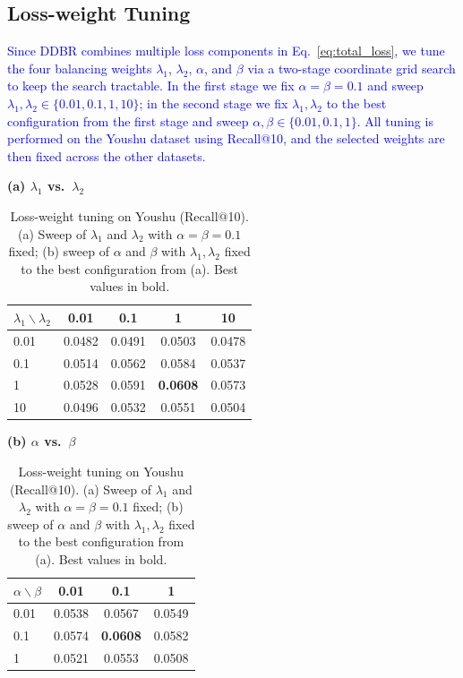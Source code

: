 \documentclass[lettersize,journal]{IEEEtran}
\newcommand{\revise}[1]{\textcolor{blue}{#1}}
\begin{document}
\subsection{Loss-weight Tuning}
\label{sec:loss_weight}
\revise{Since DDBR combines multiple loss components in Eq.~\eqref{eq:total_loss}, we tune the four balancing weights $\lambda_1$, $\lambda_2$, $\alpha$, and $\beta$ via a two-stage coordinate grid search to keep the search tractable. In the first stage we fix $\alpha=\beta=0.1$ and sweep $\lambda_1,\lambda_2\in\{0.01,0.1,1,10\}$; in the second stage we fix $\lambda_1,\lambda_2$ to the best configuration from the first stage and sweep $\alpha,\beta\in\{0.01,0.1,1\}$. All tuning is performed on the Youshu dataset using Recall@10, and the selected weights are then fixed across the other datasets.}

\begin{table}[htbp]
\caption{Loss-weight tuning on Youshu (Recall@10). (a) Sweep of $\lambda_1$ and $\lambda_2$ with $\alpha=\beta=0.1$ fixed; (b) sweep of $\alpha$ and $\beta$ with $\lambda_1,\lambda_2$ fixed to the best configuration from (a). Best values in bold.}
\label{tab:loss_weight}
\centering
\begin{minipage}{0.47\linewidth}\centering
\textbf{(a) $\lambda_1$ vs.\ $\lambda_2$} \\[0.2em]
\begin{tabular}{lcccc}
\toprule
$\lambda_1 \backslash \lambda_2$ & 0.01 & 0.1 & 1 & 10 \\
\midrule
0.01 & 0.0482 & 0.0491 & 0.0503 & 0.0478 \\
0.1  & 0.0514 & 0.0562 & 0.0584 & 0.0537 \\
1    & 0.0528 & 0.0591 & \textbf{0.0608} & 0.0573 \\
10   & 0.0496 & 0.0532 & 0.0551 & 0.0504 \\
\bottomrule
\end{tabular}
\end{minipage}\hfill
\begin{minipage}{0.47\linewidth}\centering
\textbf{(b) $\alpha$ vs.\ $\beta$} \\[0.2em]
\begin{tabular}{lccc}
\toprule
$\alpha \backslash \beta$ & 0.01 & 0.1 & 1 \\
\midrule
0.01 & 0.0538 & 0.0567 & 0.0549 \\
0.1  & 0.0574 & \textbf{0.0608} & 0.0582 \\
1    & 0.0521 & 0.0553 & 0.0508 \\
\bottomrule
\end{tabular}
\end{minipage}
\end{table}
\end{document}
